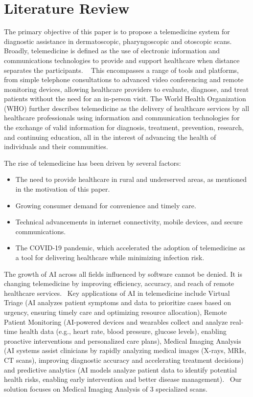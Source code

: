 \chapter{Literature Review}
The primary objective of this paper is to propose a telemedicine system for diagnostic assistance in dermatoscopic, pharyngoscopic and otoscopic scans. Broadly, telemedicine is defined as the use of electronic information and communications technologies to provide and support healthcare when distance separates the participants. ~\cite{field} This encompasses a range of tools and platforms, from simple telephone consultations to advanced video conferencing and remote monitoring devices, allowing healthcare providers to evaluate, diagnose, and treat patients without the need for an in-person visit. The World Health Organization (WHO) further describes telemedicine as the delivery of healthcare services by all healthcare professionals using information and communication technologies for the exchange of valid information for diagnosis, treatment, prevention, research, and continuing education, all in the interest of advancing the health of individuals and their communities.~\cite{who} \par

The rise of telemedicine has been driven by several factors:

\begin{itemize}
    \item The need to provide healthcare in rural and underserved areas, as mentioned in the motivation of this paper.
    \item Growing consumer demand for convenience and timely care.
    \item Technical advancements in internet connectivity, mobile devices, and secure communications.
    \item The COVID-19 pandemic, which accelerated the adoption of telemedicine as a tool for delivering healthcare while minimizing infection risk.~\cite{who}
\end{itemize} 

The growth of AI across all fields influenced by software cannot be denied. It is changing telemedicine by improving efficiency, accuracy, and reach of remote healthcare services.~\cite{anto} Key applications of AI in telemedicine include Virtual Triage (AI analyzes patient symptoms and data to prioritize cases based on urgency, ensuring timely care and optimizing resource allocation), Remote Patient Monitoring (AI-powered devices and wearables collect and analyze real-time health data (e.g., heart rate, blood pressure, glucose levels), enabling proactive interventions and personalized care plans), Medical Imaging Analysis (AI systems assist clinicians by rapidly analyzing medical images (X-rays, MRIs, CT scans), improving diagnostic accuracy and accelerating treatment decisions) and predictive analytics (AI models analyze patient data to identify potential health risks, enabling early intervention and better disease management).~\cite{leeway} Our solution focuses on Medical Imaging Analysis of 3 specialized scans. \par


